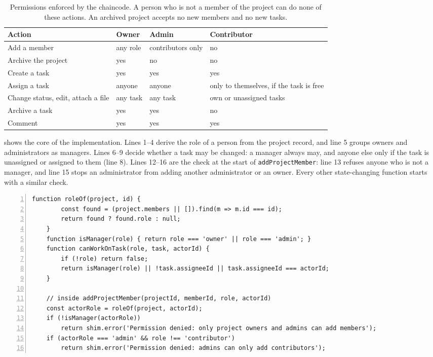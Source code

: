 \begin{table}[htbp]
    \centering
    \begin{tabularx}{\textwidth}{>{\raggedright\arraybackslash}X >{\raggedright\arraybackslash}p{2.6cm} >{\raggedright\arraybackslash}p{2.9cm} >{\raggedright\arraybackslash}X}
        \toprule
        Action & Owner & Admin & Contributor \\
        \midrule
        Add a member & any role & contributors only & no \\
        Archive the project & yes & no & no \\
        Create a task & yes & yes & yes \\
        Assign a task & anyone & anyone & only to themselves, if the task is free \\
        Change status, edit, attach a file & any task & any task & own or unassigned tasks \\
        Archive a task & yes & yes & no \\
        Comment & yes & yes & yes \\
        \bottomrule
    \end{tabularx}
    \caption{Permissions enforced by the chaincode. A person who is not a member of the project can do none of these actions. An archived project accepts no new members and no new tasks.}
    \label{tab:permissions}
\end{table}

 shows the core of the implementation. Lines 1--4 derive the role of a person from the project record, and line 5 groups owners and administrators as managers. Lines 6--9 decide whether a task may be changed: a manager always may, and anyone else only if the task is unassigned or assigned to them (line 8). Lines 12--16 are the check at the start of \texttt{addProjectMember}: line 13 refuses anyone who is not a manager, and line 15 stops an administrator from adding another administrator or an owner. Every other state-changing function starts with a similar check.

\begin{lstlisting}[caption={Role helpers and the check in \texttt{addProjectMember} (simplified from the chaincode).}, label={lst:permissions}, numbers=left, basicstyle=\ttfamily\footnotesize, language={}, autogobble]
    function roleOf(project, id) {
        const found = (project.members || []).find(m => m.id === id);
        return found ? found.role : null;
    }
    function isManager(role) { return role === 'owner' || role === 'admin'; }
    function canWorkOnTask(role, task, actorId) {
        if (!role) return false;
        return isManager(role) || !task.assigneeId || task.assigneeId === actorId;
    }

    // inside addProjectMember(projectId, memberId, role, actorId)
    const actorRole = roleOf(project, actorId);
    if (!isManager(actorRole))
        return shim.error('Permission denied: only project owners and admins can add members');
    if (actorRole === 'admin' && role !== 'contributor')
        return shim.error('Permission denied: admins can only add contributors');
\end{lstlisting}

